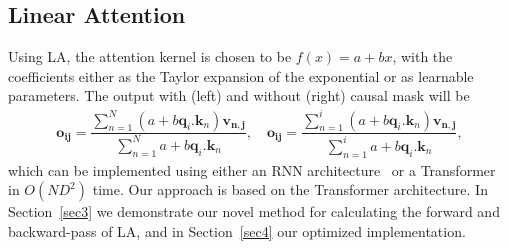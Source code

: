\subsection{Linear Attention}
Using LA, the attention kernel is chosen to be $f(x) = a+bx$, with the coefficients either as the Taylor expansion of the exponential or as learnable parameters. The output with (left) and without (right) causal mask will be
\begin{align}
    \mathbf{o_{ij}} = \dfrac{\sum_{n=1}^{N}(a + b\mathbf{q}_i.\mathbf{k}_n)\mathbf{v_{n,j}}}{\sum_{n=1}^{N}a + b\mathbf{q}_i.\mathbf{k}_n},\quad \mathbf{o_{ij}} = \dfrac{\sum_{n=1}^{i}(a + b\mathbf{q}_i.\mathbf{k}_n)\mathbf{v_{n,j}}}{\sum_{n=1}^{i}a + b\mathbf{q}_i.\mathbf{k}_n},
\end{align}
which can be implemented using either an RNN architecture~\cite{pmlr-v119-katharopoulos20a, yang2023gated} or a Transformer~\cite{han2023flatten, cai2022efficientvit, zhang2024hedgehog, wangLinformerSelfAttentionLinear2020, shen2021efficient,you2024linear} in $O(ND^2)$ time. Our approach is based on the Transformer architecture. In Section~\ref{sec3} we demonstrate our novel method for calculating the forward and backward-pass of LA, and in Section~\ref{sec4} our optimized implementation.


